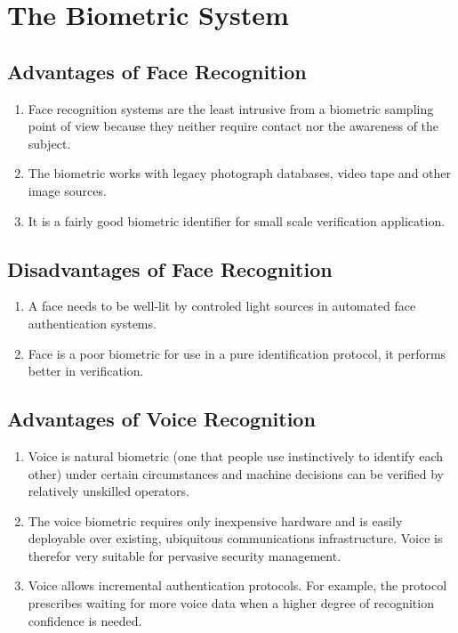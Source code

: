 \section{The Biometric System}

\subsection{Advantages of Face Recognition}

\begin{enumerate}
  \item Face recognition systems are the least intrusive from a biometric sampling point of view because they neither require contact nor the awareness of the subject.
  \item The biometric works with legacy photograph databases, video tape and other image sources.
  \item It is a fairly good biometric identifier for small scale verification application.
\end{enumerate}

\subsection{Disadvantages of Face Recognition}

\begin{enumerate}
  \item A face needs to be well-lit by controled light sources in automated face authentication systems.
  \item Face is a poor biometric for use in a pure identification protocol, it performs better in verification.
\end{enumerate}

\subsection{Advantages of Voice Recognition}

\begin{enumerate}
  \item Voice is  natural biometric (one that people use instinctively to identify each other) under certain circumstances and machine decisions can be verified by relatively unskilled operators.
  \item The voice biometric requires only inexpensive hardware and is easily deployable over existing, ubiquitous communications infrastructure. Voice is therefor very suitable for pervasive security management.
  \item Voice allows incremental authentication protocols. For example, the protocol prescribes waiting for more voice data when a higher degree of recognition confidence is needed.
\end{enumerate}

